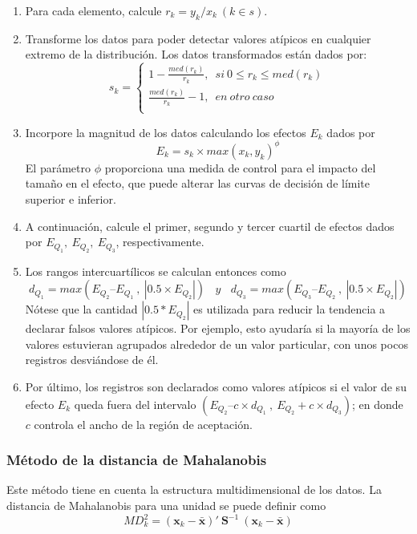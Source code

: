\documentclass[
  10pt,
  spanish,
]{book}
\providecommand{\tightlist}{%
  \setlength{\itemsep}{0pt}\setlength{\parskip}{0pt}}
\begin{document}
\begin{enumerate}
\def\labelenumi{\arabic{enumi}.}
\tightlist
\item
  Para cada elemento, calcule \(r_k=y_k/x_k \ (k\in s)\).
\item
  Transforme los datos para poder detectar valores atípicos en cualquier extremo de la distribución. Los datos transformados están dados por:
  \[
  s_k=\left\{\begin{matrix}1-\frac{med(r_k)}{r_k},\;\ si\ 0\le r_k\le m e d(r_k)\\\frac{med(r_k)}{r_k}-1,\;\ en \ otro \ caso\\\end{matrix}\right.
  \]
\item
  Incorpore la magnitud de los datos calculando los efectos \(E_k\) dados por
  \[
  E_k = s_k \times max(x_k,y_k)^\phi
  \]
  El parámetro \(\phi\) proporciona una medida de control para el impacto del tamaño en el efecto, que puede alterar las curvas de decisión de límite superior e inferior.
\item
  A continuación, calcule el primer, segundo y tercer cuartil de efectos dados por \(E_{Q_1}, \ E_{Q_2}, \ E_{Q_3}\), respectivamente.
\item
  Los rangos intercuartílicos se calculan entonces como
  \[
  d_{Q_1}=max(E_{Q_2}–E_{Q_1}\ , \ |0.5 \times E_{Q_2}|) \ \ \ \ y \ \ \ \ d_{Q_3}=max(E_{Q_3}–E_{Q_2}\ , \ |0.5 \times E_{Q_2}|) 
  \]
  Nótese que la cantidad \(|0.5*E_{Q_2}|\) es utilizada para reducir la tendencia a declarar falsos valores atípicos. Por ejemplo, esto ayudaría si la mayoría de los valores estuvieran agrupados alrededor de un valor particular, con unos pocos registros desviándose de él.
\item
  Por último, los registros son declarados como valores atípicos si el valor de su efecto \(E_k\) queda fuera del intervalo \((E_{Q_2} – c \times d_{Q_1} \ , \ E_{Q_2} + c \times d_{Q_3})\); en donde \(c\) controla el ancho de la región de aceptación.
\end{enumerate}

\hypertarget{muxe9todo-de-la-distancia-de-mahalanobis}{%
\subsubsection*{Método de la distancia de Mahalanobis}\label{muxe9todo-de-la-distancia-de-mahalanobis}}

Este método tiene en cuenta la estructura multidimensional de los datos. La distancia de Mahalanobis para una unidad se puede definir como
\[
MD_k^2=(\mathbf{x}_k-\bar{\mathbf{x}})' \ \mathbf{S}^{-1} \ (\mathbf{x}_k-\bar{\mathbf{x}})
\]
\end{document}
